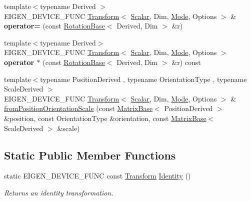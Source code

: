 \begin{DoxyCompactItemize}
\item 
\mbox{\label{class_eigen_1_1_transform_a61031984280000304b59a933ccdd9e71}} 
{\footnotesize template$<$typename Derived $>$ }\\E\+I\+G\+E\+N\+\_\+\+D\+E\+V\+I\+C\+E\+\_\+\+F\+U\+NC \mbox{\hyperlink{class_eigen_1_1_transform}{Transform}}$<$ \mbox{\hyperlink{class_eigen_1_1_transform_a4e69ced9d651745b8ed4eda46f41795d}{Scalar}}, Dim, \mbox{\hyperlink{struct_mode}{Mode}}, Options $>$ \& {\bfseries operator=} (const \mbox{\hyperlink{class_eigen_1_1_rotation_base}{Rotation\+Base}}$<$ Derived, Dim $>$ \&r)
\item 
\mbox{\label{class_eigen_1_1_transform_a82facd43077b8b517ddc553d2e3bb80f}} 
{\footnotesize template$<$typename Derived$>$ }\\E\+I\+G\+E\+N\+\_\+\+D\+E\+V\+I\+C\+E\+\_\+\+F\+U\+NC \mbox{\hyperlink{class_eigen_1_1_transform}{Transform}}$<$ \mbox{\hyperlink{class_eigen_1_1_transform_a4e69ced9d651745b8ed4eda46f41795d}{Scalar}}, Dim, \mbox{\hyperlink{struct_mode}{Mode}}, Options $>$ {\bfseries operator $\ast$} (const \mbox{\hyperlink{class_eigen_1_1_rotation_base}{Rotation\+Base}}$<$ Derived, Dim $>$ \&r) const
\item 
{\footnotesize template$<$typename Position\+Derived , typename Orientation\+Type , typename Scale\+Derived $>$ }\\E\+I\+G\+E\+N\+\_\+\+D\+E\+V\+I\+C\+E\+\_\+\+F\+U\+NC \mbox{\hyperlink{class_eigen_1_1_transform}{Transform}}$<$ \mbox{\hyperlink{class_eigen_1_1_transform_a4e69ced9d651745b8ed4eda46f41795d}{Scalar}}, Dim, \mbox{\hyperlink{struct_mode}{Mode}}, Options $>$ \& \mbox{\hyperlink{class_eigen_1_1_transform_a8eaa668cb09cd019ecb3ce5d3b75e5ce}{from\+Position\+Orientation\+Scale}} (const \mbox{\hyperlink{class_eigen_1_1_matrix_base}{Matrix\+Base}}$<$ Position\+Derived $>$ \&position, const Orientation\+Type \&orientation, const \mbox{\hyperlink{class_eigen_1_1_matrix_base}{Matrix\+Base}}$<$ Scale\+Derived $>$ \&scale)
\end{DoxyCompactItemize}
\subsection*{Static Public Member Functions}
\begin{DoxyCompactItemize}
\item 
static E\+I\+G\+E\+N\+\_\+\+D\+E\+V\+I\+C\+E\+\_\+\+F\+U\+NC const \mbox{\hyperlink{class_eigen_1_1_transform}{Transform}} \mbox{\hyperlink{class_eigen_1_1_transform_a41e2e58b09790eb8e3e220acceb7de1f}{Identity}} ()
\begin{DoxyCompactList}\small\item\em Returns an identity transformation. \end{DoxyCompactList}\end{DoxyCompactItemize}
